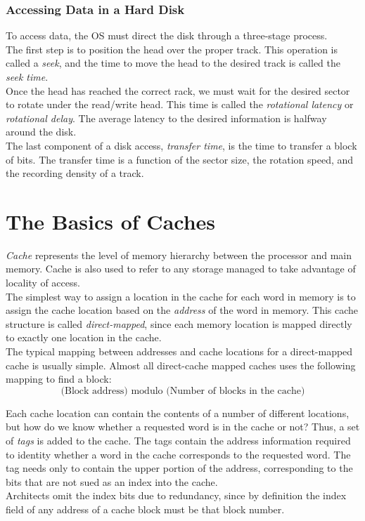\documentclass[12pt]{article}
\theoremstyle{definition}
\begin{document}
  \subsubsection{Accessing Data in a Hard Disk}
  To access data, the OS must direct the disk through a three-stage process. \\

  The first step is to position the head over the proper track.
  This operation is called a \emph{seek}, and the time to move the head to the desired track is called the \emph{seek time}. \\

  Once the head has reached the correct rack, we must wait for the desired sector to rotate under the read/write head. This time is called the \emph{rotational latency} or \emph{rotational delay}.
  The average latency to the desired information is halfway around the disk. \\

  The last component of a disk access, \emph{transfer time}, is the time to transfer a block of bits.
  The transfer time is a function of the sector size, the rotation speed, and the recording density of a track.

  \newpage
  \section{The Basics of Caches}
  \emph{Cache} represents the level of memory hierarchy between the processor and main memory.
  Cache is also used to refer to any storage managed to take advantage of locality of access. \\

  The simplest way to assign a location in the cache for each word in memory is to assign the cache location based on the \emph{address} of the word in memory.
  This cache structure is called \emph{direct-mapped}, since each memory location is mapped directly to exactly one location in the cache. \\
  The typical mapping between addresses and cache locations for a direct-mapped cache is usually simple.
  Almost all direct-cache mapped caches uses the following mapping to find a block:
  $$\text{(Block address) modulo (Number of blocks in the cache)}$$

  Each cache location can contain the contents of a number of different locations, but how do we know whether a requested word is in the cache or not?
  Thus, a set of \emph{tags} is added to the cache.
  The tags contain the address information required to identity whether a word in the cache corresponds to the requested word.
  The tag needs only to contain the upper portion of the address, corresponding to the bits that are not sued as an index into the cache. \\
  Architects omit the index bits due to redundancy, since by definition the index field of any address of a cache block must be that block number. \\
\end{document}
